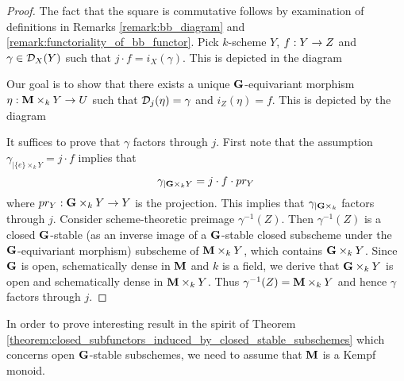 \begin{proof}
The fact that the square is commutative follows by examination of definitions in Remarks \ref{remark:bb_diagram} and \ref{remark:functoriality_of_bb_functor}. Pick $k$-scheme $Y$, $f:Y\rightarrow Z$ and $\gamma \in {\mathcal D}_X(Y)$ such that $j\cdot f = i_X(\gamma)$. This is depicted in the diagram
\begin{center}
\end{center}
Our goal is to show that there exists a unique $\mathbf{G}$-equivariant morphism $\eta:\mathbf{M}\times_kY\rightarrow U$ such that ${\mathcal D}_j(\eta) = \gamma$ and $i_Z(\eta) = f$. This is depicted by the diagram
\begin{center}
\end{center}
It suffices to prove that $\gamma$ factors through $j$. First note that the assumption $\gamma_{\mid \{e\}\times_kY} = j\cdot f$ implies that
$$\gamma_{\mid \mathbf{G}\times_kY} = j\cdot f\cdot pr_{Y}$$
where $pr_Y:\mathbf{G}\times_kY\rightarrow Y$ is the projection. This implies that $\gamma_{\mid \mathbf{G}\times_k}$ factors through $j$. Consider scheme-theoretic preimage $\gamma^{-1}(Z)$. Then $\gamma^{-1}(Z)$ is a closed $\mathbf{G}$-stable (as an inverse image of a $\mathbf{G}$-stable closed subscheme under the $\mathbf{G}$-equivariant morphism) subscheme of $\mathbf{M}\times_kY$, which contains $\mathbf{G} \times_k Y$. Since $\mathbf{G}$ is open, schematically dense in $\mathbf{M}$ and $k$ is a field, we derive that $\mathbf{G}\times_kY$ is open and schematically dense in $\mathbf{M}\times_kY$. Thus $\gamma^{-1}(Z) = \mathbf{M}\times_kY$ and hence $\gamma$ factors through $j$. 
\end{proof}
\noindent
In order to prove interesting result in the spirit of Theorem \ref{theorem:closed_subfunctors_induced_by_closed_stable_subschemes} which concerns open $\mathbf{G}$-stable subschemes, we need to assume that $\mathbf{M}$ is a Kempf monoid.

